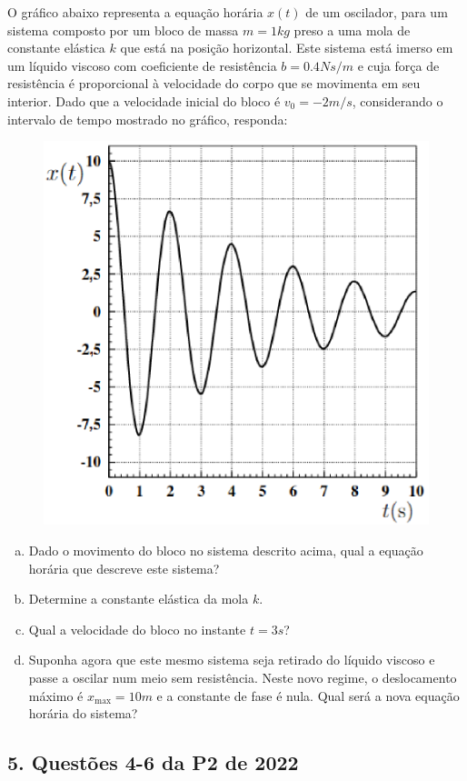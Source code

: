 \documentclass[a4paper,10pt]{article}
\begin{document}
O gráfico abaixo representa a equação horária $x(t)$ de um oscilador,
para um sistema composto por um bloco de massa $m = 1 \unit{kg}$ preso a uma mola de constante elástica
$k$ que está na posição horizontal. Este sistema está imerso em um líquido viscoso com coeficiente
de resistência $b = 0.4 \unit{Ns/m}$ e cuja força de resistência é proporcional à velocidade do corpo que se
movimenta em seu interior. Dado que a velocidade inicial do bloco é $v_0 = −2 \unit{m/s}$, considerando o
intervalo de tempo mostrado no gráfico, responda:

\begin{figure}[H]
\centering
\includegraphics[width=0.39\linewidth]{fig/grafico_sub}
\label{fig:grafico_sub}
\end{figure}

\begin{enumerate}[(a)]
\item Dado o movimento do bloco no sistema descrito acima, qual a equação horária que
descreve este sistema?

\item Determine a constante elástica da mola $k$.

\item Qual a velocidade do bloco no instante $t = 3 \unit{s}$?

\item Suponha agora que este mesmo sistema seja retirado do líquido viscoso e passe a
oscilar num meio sem resistência. Neste novo regime, o deslocamento máximo é $x_{\text{max}}=10 \unit{m}$ e a
constante de fase é nula. Qual será a nova equação horária do sistema?
\end{enumerate}

\n

\subsection*{5. Questões 4-6 da P2 de 2022}
\end{document}
